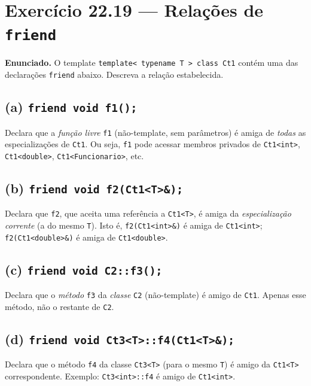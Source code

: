 \documentclass[11pt,a4paper]{article}
\begin{document}
\section{Exerc\'icio 22.19 --- Rela\c{c}\~oes de \texttt{friend}}

\begin{enunciado}
\textbf{Enunciado.} O template \texttt{template< typename T > class Ct1} cont\'em uma das declara\c{c}\~oes \texttt{friend} abaixo. Descreva a rela\c{c}\~ao estabelecida.
\end{enunciado}

\subsection*{(a) \texttt{friend void f1();}}

Declara que a \emph{fun\c{c}\~ao livre} \texttt{f1} (n\~ao-template, sem par\^ametros) \'e amiga de \emph{todas} as especializa\c{c}\~oes de \texttt{Ct1}. Ou seja, \texttt{f1} pode acessar membros privados de \texttt{Ct1<int>}, \texttt{Ct1<double>}, \texttt{Ct1<Funcionario>}, etc.

\subsection*{(b) \texttt{friend void f2(Ct1<T>\&);}}

Declara que \texttt{f2}, que aceita uma refer\^encia a \texttt{Ct1<T>}, \'e amiga da \emph{especializa\c{c}\~ao corrente} (a do mesmo \texttt{T}). Isto \'e, \texttt{f2(Ct1<int>\&)} \'e amiga de \texttt{Ct1<int>}; \texttt{f2(Ct1<double>\&)} \'e amiga de \texttt{Ct1<double>}.

\subsection*{(c) \texttt{friend void C2::f3();}}

Declara que o \emph{m\'etodo} \texttt{f3} da \emph{classe} \texttt{C2} (n\~ao-template) \'e amigo de \texttt{Ct1}. Apenas esse m\'etodo, n\~ao o restante de \texttt{C2}.

\subsection*{(d) \texttt{friend void Ct3<T>::f4(Ct1<T>\&);}}

Declara que o m\'etodo \texttt{f4} da classe \texttt{Ct3<T>} (para o mesmo \texttt{T}) \'e amigo da \texttt{Ct1<T>} correspondente. Exemplo: \texttt{Ct3<int>::f4} \'e amigo de \texttt{Ct1<int>}.
\end{document}
